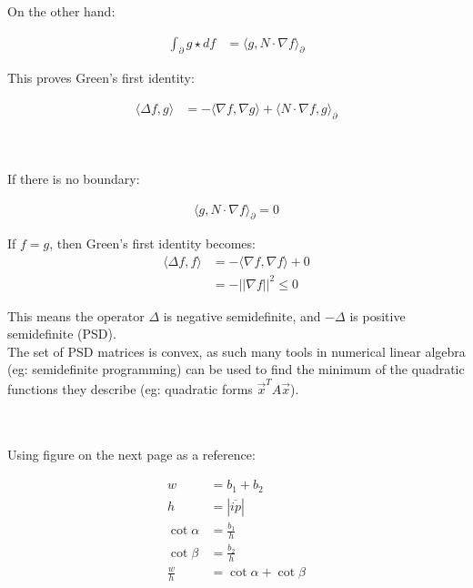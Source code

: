 \documentclass{article}
\def\grad{\nabla}
\def\lap{\Delta}
\begin{document}
On the other hand:

\begin{align*}
\int_\partial g \star df &= \langle g, N \cdot \grad f \rangle_\partial
\end{align*}


This proves Green's first identity:

\begin{align*}
\langle \lap f, g \rangle &= -\langle \grad f, \grad g \rangle + \langle N \cdot \grad f, g \rangle_\partial
\end{align*}


\vspace{1.8cm}
\\\\


If there is no boundary:

\begin{align*}
    \langle g, N \cdot \nabla f \rangle_\partial = 0
\end{align*}

If $f = g$, then Green's first identity becomes:
\begin{align*}
    \langle \lap f,f\rangle &= -\langle \nabla f, \nabla f\rangle + 0\\
        &= -||\grad f||^2 \le 0
\end{align*}

This means the operator $\lap$ is negative semidefinite, and $-\lap$ is positive semidefinite (PSD).\\
The set of PSD matrices is convex, as such many tools in numerical linear algebra (eg: semidefinite 
programming) can be used to find the minimum of the quadratic functions they describe (eg: quadratic forms
$\vec{x}^T A \vec{x}$).


\vspace{1.8cm}
\\\\

Using figure on the next page as a reference:

\begin{align*}
    w &= b_1 + b_2\\
    h &= |\overline{ip}|\\
    \cot\alpha &= \frac{b_1}{h}\\
    \cot\beta &= \frac{b_2}{h}\\
    \frac{w}{h} &= \cot\alpha + \cot\beta
\end{align*}
    
\end{document}
